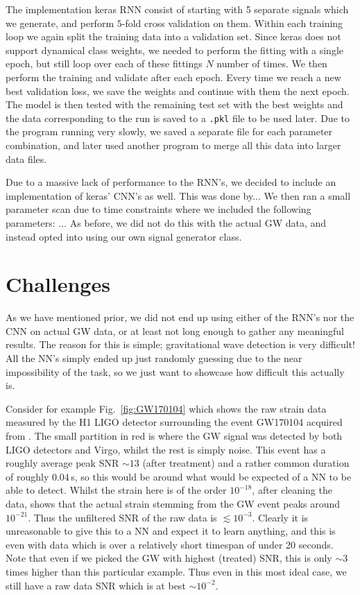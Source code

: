 \documentclass[%
reprint,
amsmath,amssymb,
aps,
]{revtex4-2}
\begin{document}
The implementation keras RNN consist of starting with 5 separate signals which we generate, and perform $5$-fold cross validation on them. Within each training loop we again split the training data into a validation set. Since keras does not support dynamical class weights, we needed to perform the fitting with a single epoch, but still loop over each of these fittings $N$ number of times. We then perform the training and validate after each epoch. Every time we reach a new best validation loss, we save the weights and continue with them the next epoch. The model is then tested with the remaining test set with the best weights and the data corresponding to the run is saved to a \texttt{.pkl} file to be used later. Due to the program running very slowly, we saved a separate file for each parameter combination, and later used another program to merge all this data into larger data files.

Due to a massive lack of performance to the RNN's, we decided to include an implementation of keras' CNN's as well. This was done by... We then ran a small parameter scan due to time constraints where we included the following parameters: ... As before, we did not do this with the actual GW data, and instead opted into using our own signal generator class.

\section{Challenges}
\label{sec:challenges}
As we have mentioned prior, we did not end up using either of the RNN's nor the CNN on actual GW data, or at least not long enough to gather any meaningful results. The reason for this is simple; gravitational wave detection is very difficult! All the NN's simply ended up just randomly guessing due to the near impossibility of the task, so we just want to showcase how difficult this actually is.

Consider for example Fig.~\ref{fig:GW170104} which shows the raw strain data measured by the H1 LIGO detector surrounding the event GW170104 acquired from \cite{gwosc}. The small partition in red is where the GW signal was detected by both LIGO detectors and Virgo, whilst the rest is simply noise. This event has a roughly average peak SNR $\sim13$ (after treatment) and a rather common duration of roughly $0.04\,$s, so this would be around what would be expected of a NN to be able to detect. Whilst the strain here is of the order $10^{-18}$, after cleaning the data, \cite{LIGOScientific:2017bnn} shows that the actual strain stemming from the GW event peaks around $10^{-21}$. Thus the unfiltered SNR of the raw data is $\lesssim10^{-3}$. Clearly it is unreasonable to give this to a NN and expect it to learn anything, and this is even with data which is over a relatively short timespan of under 20 seconds. Note that even if we picked the GW with highest (treated) SNR, this is only $\sim3$ times higher than this particular example. Thus even in this most ideal case, we still have a raw data SNR which is at best $\sim10^{-2}$.
\end{document}
